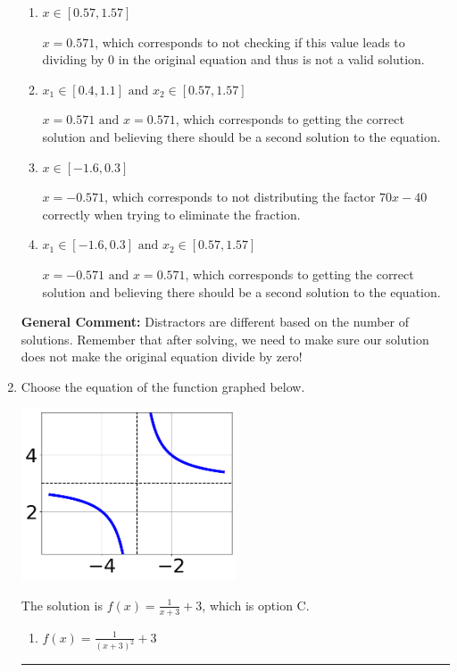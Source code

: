 \documentclass{extbook}[14pt]
\newcommand{\litem}[1]{\item #1

\rule{\textwidth}{0.4pt}}
\begin{document}
\begin{enumerate}
{\begin{enumerate}[label=\Alph*.]
*$x = 0.571$ leads to dividing by 0 in the original equation and thus is not a valid solution, which is the correct option.
\item \( x \in [0.57,1.57] \)

$x = 0.571$, which corresponds to not checking if this value leads to dividing by 0 in the original equation and thus is not a valid solution.
\item \( x_1 \in [0.4, 1.1] \text{ and } x_2 \in [0.57,1.57] \)

$x = 0.571 \text{ and } x = 0.571$, which corresponds to getting the correct solution and believing there should be a second solution to the equation.
\item \( x \in [-1.6,0.3] \)

$x = -0.571$, which corresponds to not distributing the factor $70x -40$ correctly when trying to eliminate the fraction.
\item \( x_1 \in [-1.6, 0.3] \text{ and } x_2 \in [0.57,1.57] \)

$x = -0.571 \text{ and } x = 0.571$, which corresponds to getting the correct solution and believing there should be a second solution to the equation.
\end{enumerate}

\textbf{General Comment:} Distractors are different based on the number of solutions. Remember that after solving, we need to make sure our solution does not make the original equation divide by zero!
}
\litem{
Choose the equation of the function graphed below.

\begin{center}
    \includegraphics[width=0.5\textwidth]{../Figures/rationalGraphToEquationB.png}
\end{center}


The solution is \( f(x) = \frac{1}{x + 3} + 3 \), which is option C.\begin{enumerate}[label=\Alph*.]
\item \( f(x) = \frac{1}{(x + 3)^2} + 3 \)


\end{enumerate}}
\end{enumerate}
\end{document}
